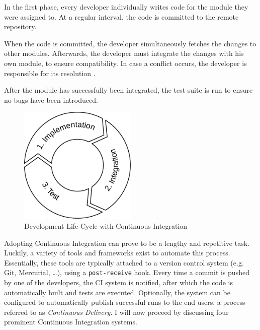 \begin{enumerate}
	 In the first phase, every developer individually writes code for the module they were assigned to. At a regular interval, the code is committed to the remote repository.
	
	 When the code is committed, the developer simultaneously fetches the changes to other modules. Afterwards, the developer must integrate the changes with his own module, to ensure compatibility. In case a conflict occurs, the developer is responsible for its resolution \cite{martin2014}.
	
	 After the module has successfully been integrated, the test suite is run to ensure no bugs have been introduced.
\end{enumerate}

\begin{figure}[htbp!]
	\centering
	\includegraphics[width=0.5\textwidth]{assets/ci-lifecycle.pdf}
	\caption{Development Life Cycle with Continuous Integration}
	\label{fig:agile-ci-lifecycle}
\end{figure}

\noindent Adopting Continuous Integration can prove to be a lengthy and repetitive task. Luckily, a variety of tools and frameworks exist to automate this process. Essentially, these tools are typically attached to a version control system (e.g. Git, Mercurial, \dots), using a \texttt{post-receive} hook. Every time a commit is pushed by one of the developers, the CI system is notified, after which the code is automatically built and tests are executed. Optionally, the system can be configured to automatically publish successful runs to the end users, a process referred to as \emph{Continuous Delivery}. I will now proceed by discussing four prominent Continuous Integration systems.


